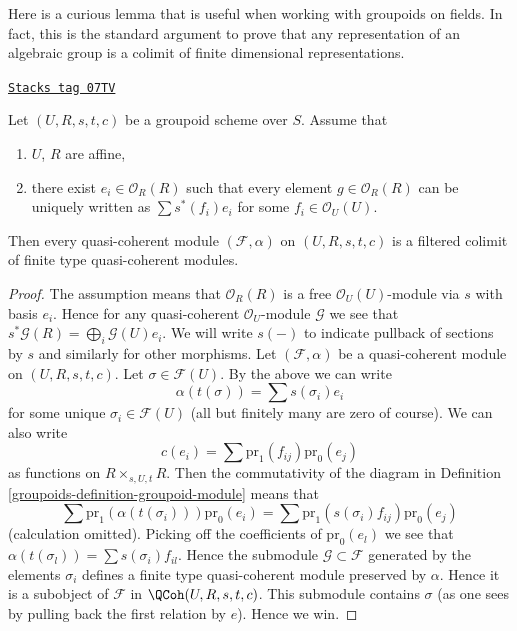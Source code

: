 Here is a curious lemma that is useful when working with groupoids
on fields. In fact, this is the standard argument to prove that any
representation of an algebraic group is a colimit of finite dimensional
representations.

\begin{lemma}
\label{groupoids-lemma-colimit-finite-type}
\href{https://stacks.math.columbia.edu/tag/07TV}{\texttt{Stacks tag 07TV}}

Let $(U, R, s, t, c)$ be a groupoid scheme over $S$.
Assume that
\begin{enumerate}
\item $U$, $R$ are affine,
\item there exist $e_i \in \mathcal{O}_R(R)$ such that
every element $g \in \mathcal{O}_R(R)$ can be uniquely written as
$\sum s^*(f_i)e_i$ for some $f_i \in \mathcal{O}_U(U)$.
\end{enumerate}
Then every quasi-coherent module $(\mathcal{F}, \alpha)$ on $(U, R, s, t, c)$
is a filtered colimit of finite type quasi-coherent modules.
\end{lemma}

\begin{proof}

The assumption means that $\mathcal{O}_R(R)$ is a free
$\mathcal{O}_U(U)$-module via $s$ with basis $e_i$. Hence
for any quasi-coherent $\mathcal{O}_U$-module $\mathcal{G}$
we see that $s^*\mathcal{G}(R) = \bigoplus_i \mathcal{G}(U)e_i$.
We will write $s(-)$ to indicate pullback of sections by $s$ and
similarly for other morphisms.
Let $(\mathcal{F}, \alpha)$ be a quasi-coherent module on
$(U, R, s, t, c)$. Let $\sigma \in \mathcal{F}(U)$. By the above
we can write
$$
\alpha(t(\sigma)) = \sum s(\sigma_i) e_i
$$
for some unique $\sigma_i \in \mathcal{F}(U)$ (all but finitely many
are zero of course). We can also write
$$
c(e_i) = \sum \text{pr}_1(f_{ij}) \text{pr}_0(e_j)
$$
as functions on $R \times_{s, U, t}R$. Then the commutativity of the diagram
in Definition \ref{groupoids-definition-groupoid-module} means that
$$
\sum \text{pr}_1(\alpha(t(\sigma_i))) \text{pr}_0(e_i)
=
\sum \text{pr}_1(s(\sigma_i)f_{ij}) \text{pr}_0(e_j)
$$
(calculation omitted). Picking off the coefficients of $\text{pr}_0(e_l)$
we see that $\alpha(t(\sigma_l)) = \sum s(\sigma_i)f_{il}$. Hence
the submodule $\mathcal{G} \subset \mathcal{F}$ generated by the
elements $\sigma_i$ defines a finite type quasi-coherent module
preserved by $\alpha$. Hence it is a subobject of $\mathcal{F}$ in
$\QCoh(U, R, s, t, c)$. This submodule contains $\sigma$
(as one sees by pulling back the first relation by $e$). Hence we win.
\end{proof}

